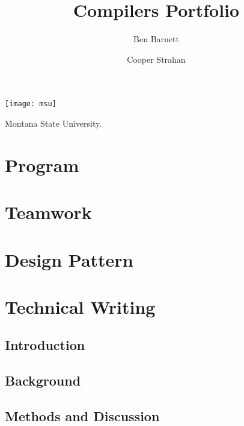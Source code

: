 \documentclass[sigconf]{acmart}
\begin{document}
\title{Compilers Portfolio}

\author{Ben Barnett}

\author{Cooper Strahan}

\begin{teaserfigure}
  \texttt{[image: msu]}
  \caption{Montana State University.}
  \label{fig:teaser}
\end{teaserfigure}

\maketitle

\section{Program}
\section{Teamwork}
\section{Design Pattern}
\section{Technical Writing}

\subsection{Introduction}

\subsection{Background}

\subsection{Methods and Discussion}
\end{document}
